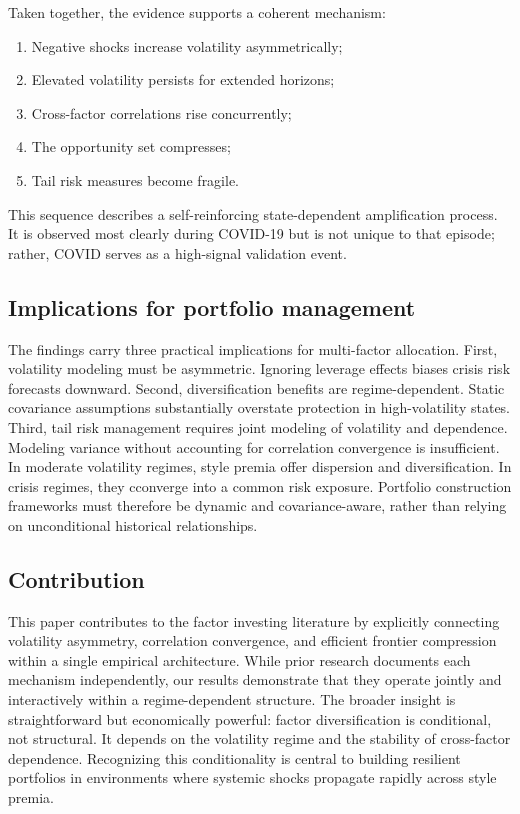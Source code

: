 \documentclass{article}
\begin{document}
Taken together, the evidence supports a coherent mechanism:

\begin{enumerate}
\item Negative shocks increase volatility asymmetrically;
\item Elevated volatility persists for extended horizons;
\item Cross-factor correlations rise concurrently;
\item The opportunity set compresses;
\item Tail risk measures become fragile.
\end{enumerate}

This sequence describes a self-reinforcing state-dependent amplification process. It is observed most clearly during COVID-19 but is not unique to that episode; rather, COVID serves as a high-signal validation event.\newline

\subsection*{Implications for portfolio management}

The findings carry three practical implications for multi-factor allocation. First, volatility modeling must be asymmetric. Ignoring leverage effects biases crisis risk forecasts downward. Second, diversification benefits are regime-dependent. Static covariance assumptions substantially overstate protection in high-volatility states. Third, tail risk management requires joint modeling of volatility and dependence. Modeling variance without accounting for correlation convergence is insufficient. In moderate volatility regimes, style premia offer dispersion and diversification. In crisis regimes, they cconverge into a common risk exposure. Portfolio construction frameworks must therefore be dynamic and covariance-aware, rather than relying on unconditional historical relationships.\newline

\subsection*{Contribution}

This paper contributes to the factor investing literature by explicitly connecting volatility asymmetry, correlation convergence, and efficient frontier compression within a single empirical architecture. While prior research documents each mechanism independently, our results demonstrate that they operate jointly and interactively within a regime-dependent structure. The broader insight is straightforward but economically powerful: factor diversification is conditional, not structural. It depends on the volatility regime and the stability of cross-factor dependence. Recognizing this conditionality is central to building resilient portfolios in environments where systemic shocks propagate rapidly across style premia.\newline
\end{document}
